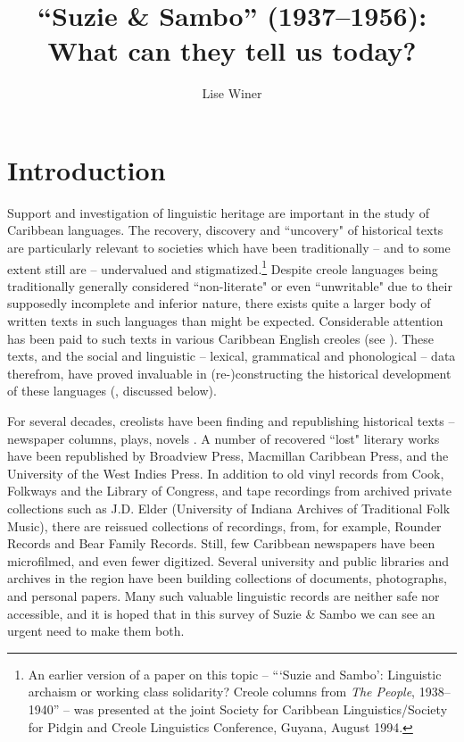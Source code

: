 \documentclass[output=paper,colorlinks,citecolor=brown]{langscibook}
\author{Lise Winer\orcid{}\affiliation{McGill University}}
\title{``Suzie \& Sambo'' (1937–1956): What can they tell us today?}
\begin{document}
\maketitle 




\section{Introduction}

Support and investigation of linguistic heritage are important in the study of Caribbean languages.  The recovery, discovery and  “uncovery" of historical texts are particularly relevant to societies which have been traditionally – and to some extent still are – undervalued and stigmatized.\footnote{An earlier version of a paper on this topic – “‘Suzie and Sambo’: Linguistic archaism or working class solidarity? Creole columns from \textit{The People}, 1938--1940” – was presented at the joint Society for Caribbean Linguistics\slash Society for Pidgin and Creole Linguistics Conference, Guyana, August 1994.} Despite creole languages being traditionally generally considered ``non-lit\-er\-ate" or even  “unwritable" due to their supposedly incomplete and inferior nature, there exists quite a larger body of written texts in such languages than might be expected. Considerable attention has been paid to such texts in various Caribbean English creoles (see \citealt{BakerBruyn1999,lalla_dacosta1990,migge_mühleisen2010,winer1991new,winer1993,winer1995penny, winer1997six,winer2003,winerbuzelin2008,winer_gilbert1987,winer_rimmer1994}). These texts, and the social and linguistic – lexical, grammatical and phonological – data therefrom, have proved invaluable in (re-)constructing the historical development of these languages (\citealt{Winford1997re-exam}, discussed below).

For several decades, creolists have been finding and republishing historical texts – newspaper columns, plays, novels \citep{Brereton_winer2021}.  A number of recovered ``lost" literary works have been republished by Broadview Press, Macmillan Caribbean Press, and the University of the West Indies Press.  In addition to old vinyl records from Cook, Folkways and the Library of Congress, and tape recordings from archived private collections such as J.D. Elder (University of Indiana Archives of Traditional Folk Music), there are reissued collections of recordings, from, for example, Rounder Records and Bear Family Records.  Still, few Caribbean newspapers have been microfilmed, and even fewer digitized.  Several university and public libraries and archives in the region have been building collections of documents, photographs, and personal papers.  Many such valuable linguistic records are neither safe nor accessible, and it is hoped that in this survey of Suzie \& Sambo we can see an urgent need to make them both.
\end{document}
